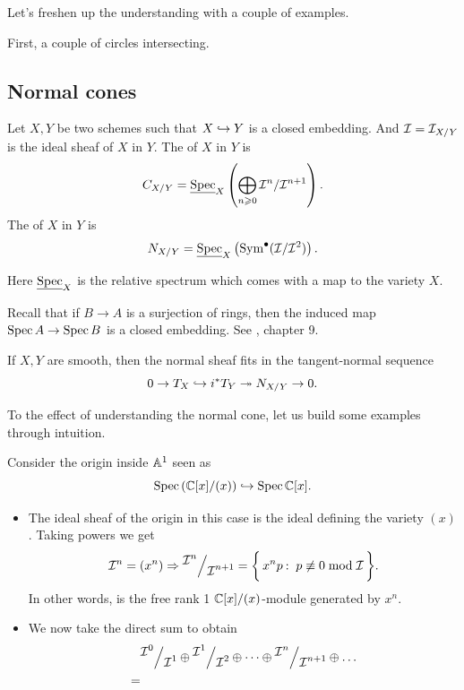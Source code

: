 \documentclass[12pt]{memoir}
\begin{document}
Let's freshen up the understanding with a couple of examples.

\begin{Ex}
    First, a couple of circles intersecting.
\end{Ex}


\subsection{Normal cones}

\begin{Def}
    Let \(X,Y\) be two schemes such that \(X\hookrightarrow Y\) is a closed embedding. And \(\mathcal{I}=\mathcal{I}_{X/Y}\) is the ideal sheaf of \(X\) in \(Y\). The  of \(X\) in \(Y\) is
    \[    C_{X/Y} =\underline{\operatorname{Spec}}_X\left(\bigoplus_{n\geqslant 0}\mathcal{I}^n/\mathcal{I}^{n+1}\right).
    \]
    The  of \(X\) in \(Y\) is
    \[    N_{X/Y}=\underline{\operatorname{Spec}}_{X}\left(\operatorname{Sym}^\bullet(\mathcal{I}/\mathcal{I}^2)\right).
    \]
\end{Def}

\begin{Rmk}
    Here \(\underline{\operatorname{Spec}}_X\) is the relative spectrum which comes with a map to the variety \(X\).
\end{Rmk}

\begin{Rmk}
    Recall that if \(B\to A\) is a surjection of rings, then the induced map \(\operatorname{Spec} A\to\operatorname{Spec} B\) is a closed embedding. See \cite{VakilRisingSea}, chapter 9.
\end{Rmk}

\begin{Rmk}
    If \(X,Y\) are smooth, then the normal sheaf fits in the tangent-normal sequence
    \[    0\to T_X\hookrightarrow i^\ast T_Y\twoheadrightarrow N_{X/Y}\to 0.
    \]
\end{Rmk}

To the effect of understanding the normal cone, let us build some examples through intuition.

\begin{Ex}
    Consider the origin inside \(\mathbb{A}^1\) seen as
    \[\operatorname{Spec}\left(\mathbb{C}[x]/(x)\right)\hookrightarrow\operatorname{Spec}\mathbb{C}[x].\]
    \begin{itemize}
        \item The ideal sheaf of the origin in this case is the ideal defining the variety \((x)\). Taking powers we get
              \[        \cI^n=(x^n)\To \quot{\cI^n}{\cI^{n+1}}=\Set{x^np\:\ p\not\equiv 0\bmod\cI}.
              \]
              In other words, is the free rank 1 \(\mathbb{C}[x]/(x)\)-module generated by \(x^n\).
        \item We now take the direct sum to obtain
              \begin{align*}
                    & \quot{\cI^0}{\cI^{1}}\oplus\quot{\cI^1}{\cI^{2}}\opyop\quot{\cI^n}{\cI^{n+1}}\oplus\dots \\
                  = &
              \end{align*}

    \end{itemize}
\end{Ex}
\end{document}
